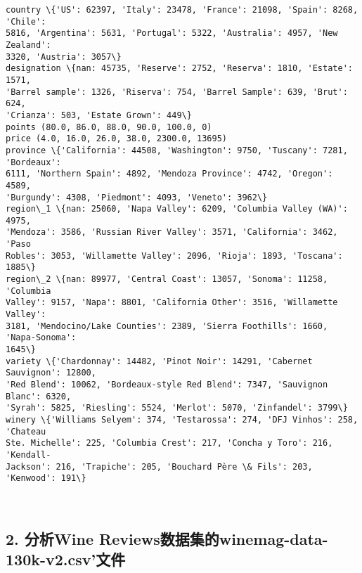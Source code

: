 \documentclass[11pt]{article}
\begin{document}
    \begin{Verbatim}[commandchars=\\\{\}]
country \{'US': 62397, 'Italy': 23478, 'France': 21098, 'Spain': 8268, 'Chile':
5816, 'Argentina': 5631, 'Portugal': 5322, 'Australia': 4957, 'New Zealand':
3320, 'Austria': 3057\}
designation \{nan: 45735, 'Reserve': 2752, 'Reserva': 1810, 'Estate': 1571,
'Barrel sample': 1326, 'Riserva': 754, 'Barrel Sample': 639, 'Brut': 624,
'Crianza': 503, 'Estate Grown': 449\}
points (80.0, 86.0, 88.0, 90.0, 100.0, 0)
price (4.0, 16.0, 26.0, 38.0, 2300.0, 13695)
province \{'California': 44508, 'Washington': 9750, 'Tuscany': 7281, 'Bordeaux':
6111, 'Northern Spain': 4892, 'Mendoza Province': 4742, 'Oregon': 4589,
'Burgundy': 4308, 'Piedmont': 4093, 'Veneto': 3962\}
region\_1 \{nan: 25060, 'Napa Valley': 6209, 'Columbia Valley (WA)': 4975,
'Mendoza': 3586, 'Russian River Valley': 3571, 'California': 3462, 'Paso
Robles': 3053, 'Willamette Valley': 2096, 'Rioja': 1893, 'Toscana': 1885\}
region\_2 \{nan: 89977, 'Central Coast': 13057, 'Sonoma': 11258, 'Columbia
Valley': 9157, 'Napa': 8801, 'California Other': 3516, 'Willamette Valley':
3181, 'Mendocino/Lake Counties': 2389, 'Sierra Foothills': 1660, 'Napa-Sonoma':
1645\}
variety \{'Chardonnay': 14482, 'Pinot Noir': 14291, 'Cabernet Sauvignon': 12800,
'Red Blend': 10062, 'Bordeaux-style Red Blend': 7347, 'Sauvignon Blanc': 6320,
'Syrah': 5825, 'Riesling': 5524, 'Merlot': 5070, 'Zinfandel': 3799\}
winery \{'Williams Selyem': 374, 'Testarossa': 274, 'DFJ Vinhos': 258, 'Chateau
Ste. Michelle': 225, 'Columbia Crest': 217, 'Concha y Toro': 216, 'Kendall-
Jackson': 216, 'Trapiche': 205, 'Bouchard Père \& Fils': 203, 'Kenwood': 191\}
    \end{Verbatim}

    \begin{center}
    \end{center}
    { \hspace*{\fill} \\}
    
    \hypertarget{ux5206ux6790wine-reviewsux6570ux636eux96c6ux7684winemag-data-130k-v2.csvux6587ux4ef6}{%
\subsection{2. 分析Wine
Reviews数据集的winemag-data-130k-v2.csv'文件}\label{ux5206ux6790wine-reviewsux6570ux636eux96c6ux7684winemag-data-130k-v2.csvux6587ux4ef6}}
\end{document}

